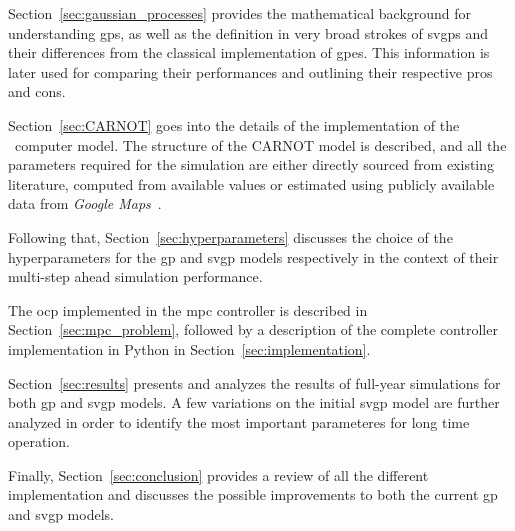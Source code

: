 Section~\ref{sec:gaussian_processes} provides the mathematical background for
understanding \acrshort{gp}s, as well as the definition in very broad strokes of
\acrshort{svgp}s and their differences from the classical implementation of
\acrlong{gp}es. This information is later used for comparing their performances
and outlining their respective pros and cons.

Section~\ref{sec:CARNOT} goes into the details of the implementation of the
\pdome\ computer model. The structure of the CARNOT model is described, and all
the parameters required for the simulation are either directly sourced from
existing literature, computed from available values or estimated using publicly
available data from \textit{Google Maps}~\cite{GoogleMaps}.

Following that, Section~\ref{sec:hyperparameters} discusses the choice of the
hyperparameters for the \acrshort{gp} and \acrshort{svgp} models respectively in
the context of their multi-step ahead simulation performance.

The \acrlong{ocp} implemented in the \acrshort{mpc} controller is described in
Section~\ref{sec:mpc_problem}, followed by a description of the complete
controller implementation in Python in Section~\ref{sec:implementation}.

Section~\ref{sec:results} presents and analyzes the results of full-year
simulations for both \acrshort{gp} and \acrshort{svgp} models. A few variations
on the initial \acrshort{svgp} model are further analyzed in order to identify
the most important parameteres for long time operation.

Finally, Section~\ref{sec:conclusion} provides a review of all the different
implementation and  discusses the possible improvements to both the current
\acrshort{gp} and \acrshort{svgp} models.

\clearpage

